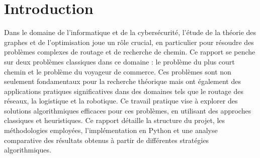 \chapter{Introduction}
\label{chap:introduction}
Dans le domaine de l'informatique et de la cybersécurité, l'étude de la théorie des graphes et de l'optimisation joue un rôle crucial, en particulier pour résoudre des problèmes complexes de routage et de recherche de chemin. Ce rapport se penche sur deux problèmes classiques dans ce domaine : le problème du plus court chemin et le problème du voyageur de commerce. Ces problèmes sont non seulement fondamentaux pour la recherche théorique mais ont également des applications pratiques significatives dans des domaines tels que le routage des réseaux, la logistique et la robotique. Ce travail pratique vise à explorer des solutions algorithmiques efficaces pour ces problèmes, en utilisant des approches classiques et heuristiques. Ce rapport détaille la structure du projet, les méthodologies employées, l'implémentation en Python et une analyse comparative des résultats obtenus à partir de différentes stratégies algorithmiques.